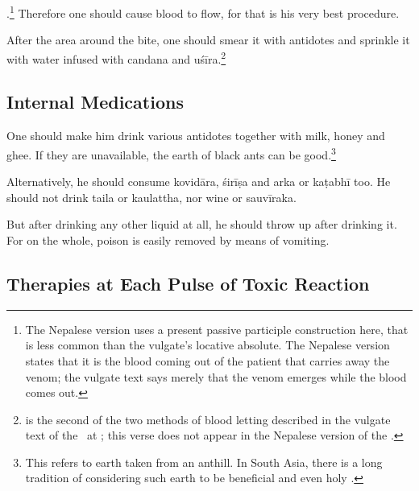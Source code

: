\begin{translation}
\item [15] 

.\footnote{The
    Nepalese version uses a present passive participle construction here,
    that is less common than the vulgate's locative absolute.  The Nepalese 
    version states that it is the blood coming out of the patient that carries away 
    the venom; the vulgate text says merely that the venom emerges while the 
    blood comes out.} Therefore one
    should cause blood to flow, for that is his very best procedure.

\item [16]  

After  the area around the bite, one should smear
it with antidotes and sprinkle it with water infused with
\gls{candana} and \gls{uśīra}.\footnote{ is the second of
    the two methods of blood letting  described in the vulgate text of the \SS\ at 
    ; this verse does not appear in the Nepalese version of the 
    \SS.\label{pracchana}}\label{5.5.16}

\subsection{Internal Medications}

\item [17]

One should make him drink various antidotes together
with milk, honey and ghee. If they are unavailable, the earth of black
ants can be good.\footnote{This refers to earth taken from an anthill. 
    In South Asia, there is a long tradition of considering such earth to be
    beneficial and even holy \citep[e.g.,][]{irwi-1982}.}


\item [18]

Alternatively, he should consume \gls{kovidāra}, \gls{śirīṣa}
and \gls{arka} or \gls{kaṭabhī} too.  He should not drink \gls{taila} or
\gls{kaulattha}, nor wine or  \gls{sauvīraka}.


\item [19]

But after drinking any other liquid at all, he should throw up after drinking it.  For 
on the whole, poison is easily removed by means of vomiting. 

\subsection{Therapies at Each Pulse of Toxic Reaction}


\end{translation}
